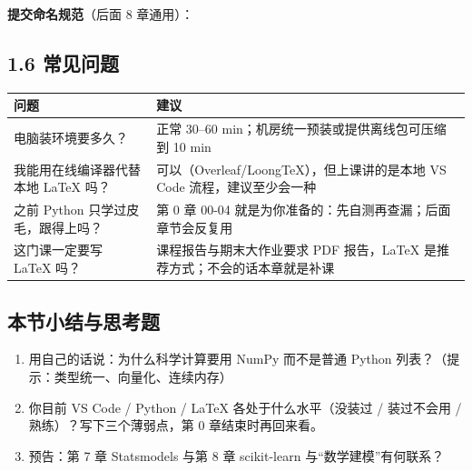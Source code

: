 \textbf{提交命名规范}（后面 8 章通用）：

\begin{Shaded}
\begin{Highlighting}[]
\end{Highlighting}
\end{Shaded}

\subsection{1.6 常见问题}\label{ux5e38ux89c1ux95eeux9898}

{\def\LTcaptype{none} %
\begin{longtable}[]{@{}
  >{\raggedright\arraybackslash}p{}
  >{\raggedright\arraybackslash}p{}@{}}
\toprule\noalign{}
\begin{minipage}[b]{\linewidth}\raggedright
问题
\end{minipage} & \begin{minipage}[b]{\linewidth}\raggedright
建议
\end{minipage} \\
\midrule\noalign{}
\endhead
\bottomrule\noalign{}
\endlastfoot
电脑装环境要多久？ & 正常 30--60 min；机房统一预装或提供离线包可压缩到
10 min \\
我能用在线编译器代替本地 LaTeX 吗？ &
可以（Overleaf/LoongTeX），但上课讲的是本地 VS Code
流程，建议至少会一种 \\
之前 Python 只学过皮毛，跟得上吗？ & 第 0 章 00-04
就是为你准备的：先自测再查漏；后面章节会反复用 \\
这门课一定要写 LaTeX 吗？ & 课程报告与期末大作业要求 PDF 报告，LaTeX
是推荐方式；不会的话本章就是补课 \\
\end{longtable}
}

\subsection{本节小结与思考题}\label{ux672cux8282ux5c0fux7ed3ux4e0eux601dux8003ux9898}

\begin{enumerate}
\def\labelenumi{\arabic{enumi}.}
\tightlist
\item
  用自己的话说：为什么科学计算要用 NumPy 而不是普通 Python
  列表？（提示：类型统一、向量化、连续内存）
\item
  你目前 VS Code / Python / LaTeX 各处于什么水平（没装过 / 装过不会用 /
  熟练）？写下三个薄弱点，第 0 章结束时再回来看。
\item
  预告：第 7 章 Statsmodels 与第 8 章 scikit-learn
  与``数学建模''有何联系？
\end{enumerate}

